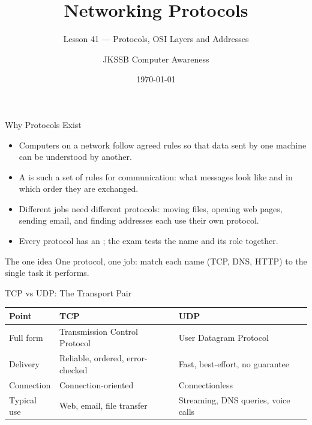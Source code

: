 \documentclass[aspectratio=169]{beamer}
\title{Networking Protocols}
\subtitle{Lesson 41 --- Protocols, OSI Layers and Addresses}
\author{JKSSB Computer Awareness}
\date{\today}
\begin{document}
\frame{\titlepage}

\begin{frame}{Why Protocols Exist}
  \begin{itemize}
    \item Computers on a network follow agreed rules so that data sent by one
      machine can be understood by another.
    \item A  is such a set of rules for communication: what
      messages look like and in which order they are exchanged.
    \item Different jobs need different protocols: moving files, opening web
      pages, sending email, and finding addresses each use their own protocol.
    \item Every protocol has an ; the exam tests the
      name and its role together.
  \end{itemize}
  \begin{block}{The one idea}
    One protocol, one job: match each name (TCP, DNS, HTTP) to the single
    task it performs.
  \end{block}
\end{frame}

\begin{frame}{TCP vs UDP: The Transport Pair}
  \begin{center}
    \begin{tabular}{lll}
      \toprule
      \textbf{Point} & \textbf{TCP} & \textbf{UDP} \\
      \midrule
      Full form & Transmission Control Protocol & User Datagram Protocol \\
      Delivery & Reliable, ordered, error-checked & Fast, best-effort, no guarantee \\
      Connection & Connection-oriented & Connectionless \\
      Typical use & Web, email, file transfer & Streaming, DNS queries, voice calls \\
      \bottomrule
    \end{tabular}
  \end{center}
  \vspace{0.25cm}
\end{frame}
\end{document}
